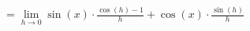 \documentclass[preview]{standalone}
\begin{document}
\begin{align*}
= \lim_{h \to 0} \sin(x) \cdot \frac{\cos(h) - 1}{h} + \cos(x) \cdot \frac{\sin(h)}{h}
\end{align*}
\end{document}
